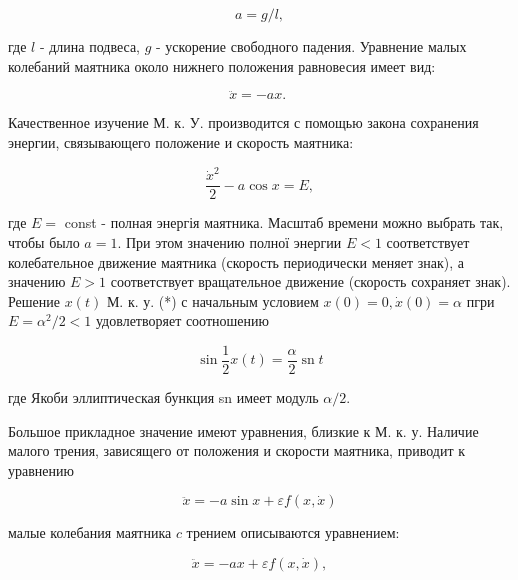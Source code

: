 \documentclass[10pt]{article}
\begin{document}
\[

a=g / l,

\]



где $l$ - длина подвеса, $g$ - ускорение свободного падения. Уравнение малых колебаний маятника около нижнего положения равновесия имеет вид:



\[

\ddot{x}=-a x \text {. }

\]



Качественное изучение М. к. У. производится с помощью закона сохранения энергии, связывающего положение и скорость маятника:



\[

\frac{\dot{x}^{2}}{2}-a \cos x=E,

\]



где $E=$ const - полная энергія маятника. Масштаб времени можно выбрать так, чтобы было $a=1$. При этом значению полної энергии $E<1$ соответствует колебательное движение маятника (скорость периодически меняет знак), а значению $E>1$ соответствует вращательное движение (скорость сохраняет знак). Решение $x(t)$ М. к. у. (*) с начальным условием $x(0)=0, \dot{x}(0)=\alpha$ пгри $E=\alpha^{2} / 2<1$ удовлетворяет соотношению



\[

\sin \frac{1}{2} x(t)=\frac{\alpha}{2} \operatorname{sn} t

\]



где Якоби эллиптическая бункция sn имеет модуль $\alpha / 2$.



Большое прикладное значение имеют уравнения, близкие к М. к. у. Наличие малого трения, зависящего от положения и скорости маятника, приводит к уравнению



\[

\ddot{x}=-a \sin x+\varepsilon f(x, \dot{x})

\]



малые колебания маятника $c$ трением описываются уравнением:



\[

\ddot{x}=-a x+\varepsilon f(x, \dot{x}),

\]
\end{document}

